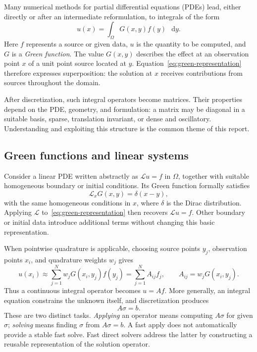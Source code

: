 \documentclass[11pt,a4paper]{article}
\newcommand{\dd}{\mathop{}\!\mathrm{d}}
\begin{document}
Many numerical methods for partial differential equations (PDEs) lead, either directly or after an intermediate reformulation, to integrals of the form
\begin{equation}
    u(x) = \int_\Omega G(x,y) f(y)\,\dd y.
    \label{eq:green-representation}
\end{equation}
Here $f$ represents a source or given data, $u$ is the quantity to be computed, and $G$ is a \emph{Green function}. The value $G(x,y)$ describes the effect at an observation point $x$ of a unit point source located at $y$. Equation~\eqref{eq:green-representation} therefore expresses superposition: the solution at $x$ receives contributions from sources throughout the domain.

After discretization, such integral operators become matrices. Their properties depend on the PDE, geometry, and formulation: a matrix may be diagonal in a suitable basis, sparse, translation invariant, or dense and oscillatory. Understanding and exploiting this structure is the common theme of this report.

\subsection{Green functions and linear systems}
Consider a linear PDE written abstractly as $\mathcal Lu=f$ in $\Omega$, together with suitable homogeneous boundary or initial conditions. Its Green function formally satisfies
\begin{equation}
    \mathcal L_xG(x,y)=\delta(x-y),
\end{equation}
with the same homogeneous conditions in $x$, where $\delta$ is the Dirac distribution. Applying $\mathcal L$ to~\eqref{eq:green-representation} then recovers $\mathcal Lu=f$. Other boundary or initial data introduce additional terms without changing this basic representation.

When pointwise quadrature is applicable, choosing source points $y_j$, observation points $x_i$, and quadrature weights $w_j$ gives
\begin{equation}
    u(x_i)\approx\sum_{j=1}^{N}w_jG(x_i,y_j)f(y_j)
    =\sum_{j=1}^{N}A_{ij}f_j,
    \qquad A_{ij}=w_jG(x_i,y_j).
    \label{eq:discrete-green}
\end{equation}
Thus a continuous integral operator becomes $u=Af$. More generally, an integral equation constrains the unknown itself, and discretization produces
\begin{equation}
    A\sigma=b.
    \label{eq:generic-system}
\end{equation}
These are two distinct tasks. \emph{Applying} an operator means computing $A\sigma$ for given $\sigma$; \emph{solving} means finding $\sigma$ from $A\sigma=b$. A fast apply does not automatically provide a stable fast solve. Fast direct solvers address the latter by constructing a reusable representation of the solution operator.
\end{document}
